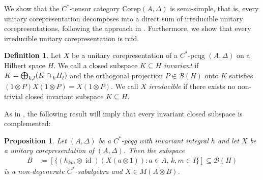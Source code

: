 \documentclass[11pt]{article}
\newcommand{\Corep}{\mathrm{Corep}}
\DeclareMathOperator{\id}{id}
\newcommand{\Gr}[5]{\tensor*[^{#2}_{#4}]{#1}{^{#3}_{#5}}}%
\newcommand{\Grd}[3]{\Gr{#1}{}{}{#2}{#3}}
\newtheorem{Prop}[Theorem]{Proposition}
\theoremstyle{definition}
\newtheorem{Def}[Theorem]{Definition}
\numberwithin{equation}{section}
\begin{document}
We show that the $C^{*}$-tensor category $\Corep(A,\Delta)$ is semi-simple, that is, every unitary
corepresentation decomposes into a direct sum of irreducible unitary corepresentations, following
the approach in \cite{MVD1}. Furthermore, we show that every irreducible unitary corepresentation is rcfd.

\begin{Def}
Let $X$ be a unitary corepresentation of a $C^{*}$-pcqg $(A,\Delta)$ on a
  Hilbert space $H$. We call a closed subspace $K\subseteq H$
  \emph{invariant} if $K=\bigoplus_{k,l} (K \cap \Grd{H}{k}{l})$ and
  the orthogonal projection $P\in \mathcal{B}(H)$ onto $K$ satisfies
  $(1\otimes P)X(1\otimes P)=X(1\otimes P)$.  We call $X$
  \emph{irreducible} if there exists no non-trivial closed invariant
  subspace $K\subseteq H$.
\end{Def}
As in \cite{MVD1}, the  following result will imply that every invariant closed subspace is complemented:
 \begin{Prop}\label{prop:corep-complemented}
   Let $(A,\Delta)$ be a $C^{*}$-pcqg with invariant integral $h$ and
   let $X$ be a unitary corepresentation of $(A,\Delta)$. Then the
   subspace
   \begin{align*}
     B &:= [ \{(h_{km} \otimes
     \id)(X(a\otimes 1)) : a \in A,\, k,m\in I\}] \subseteq \mathcal{B}(H)
   \end{align*}
   is a non-degenerate $C^{*}$-subalgebra and $X\in M(A\otimes B)$.
 \end{Prop}
\end{document}

